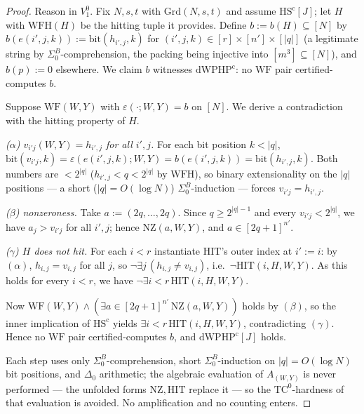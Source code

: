 \documentclass[10pt,a4paper]{amsart}
\newcommand{\Grd}{\mathrm{Grd}}
\newcommand{\HIT}{\mathrm{HIT}}
\newcommand{\HScert}{\mathrm{HS}^{\mathrm{c}}}
\newcommand{\NZ}{\mathrm{NZ}}
\newcommand{\SigmaB}{\Sigma^B_0}
\newcommand{\Vone}{V^0_1}
\newcommand{\WF}{\mathrm{WF}}
\newcommand{\WFH}{\mathrm{WFH}}
\newcommand{\dWPHPcert}{\mathrm{dWPHP}^{\mathrm{c}}}
\begin{document}
\begin{proof}
Reason in $\Vone$. Fix $N,s,t$ with $\Grd(N,s,t)$ and assume $\HScert[J]$;
let $H$ with $\WFH(H)$ be the hitting tuple it provides. Define
$b:=b(H)\subseteq[N]$ by $b(e(i',j,k)):=\mathrm{bit}(h_{i',j},k)$ for
$(i',j,k)\in[r]\times[n']\times[|q|]$ (a legitimate string by $\SigmaB$-comprehension,
the packing being injective into $[m^3]\subseteq[N]$), and $b(p):=0$ elsewhere.
We claim $b$ witnesses $\dWPHPcert$: no $\WF$ pair certified-computes $b$.

Suppose $\WF(W,Y)$ with $\varepsilon(\cdot;W,Y)=b$ on $[N]$. We derive a
contradiction with the hitting property of $H$.

\emph{(\(\alpha\)) $v_{i'j}(W,Y)=h_{i',j}$ for all $i',j$.} For each bit position
$k<|q|$, $\mathrm{bit}(v_{i'j},k)=\varepsilon(e(i',j,k);W,Y)=b(e(i',j,k))=
\mathrm{bit}(h_{i',j},k)$. Both numbers are $<2^{|q|}$ ($h_{i',j}<q<2^{|q|}$ by
$\WFH$), so binary extensionality on the $|q|$ positions --- a short
($|q|=O(\log N)$) $\SigmaB$-induction --- forces $v_{i'j}=h_{i',j}$.

\emph{(\(\beta\)) nonzeroness.} Take $a:=(2q,\dots,2q)$. Since $q\ge 2^{|q|-1}$
and every $v_{i'j}<2^{|q|}$, we have $a_j>v_{i'j}$ for all $i',j$; hence
$\NZ(a,W,Y)$, and $a\in[2q+1]^{n'}$.

\emph{(\(\gamma\)) $H$ does not hit.} For each $i<r$ instantiate $\HIT$'s outer
index at $i':=i$: by $(\alpha)$, $h_{i,j}=v_{i,j}$ for all $j$, so
$\neg\exists j\,(h_{i,j}\neq v_{i,j})$, i.e.\ $\neg\HIT(i,H,W,Y)$. As this holds
for every $i<r$, we have $\neg\exists i<r\,\HIT(i,H,W,Y)$.

Now $\WF(W,Y)\wedge(\exists a\in[2q+1]^{n'}\,\NZ(a,W,Y))$ holds by $(\beta)$,
so the inner implication of $\HScert$ yields $\exists i<r\,\HIT(i,H,W,Y)$,
contradicting $(\gamma)$. Hence no $\WF$ pair certified-computes $b$, and
$\dWPHPcert[J]$ holds.

Each step uses only $\SigmaB$-comprehension, short $\SigmaB$-induction on
$|q|=O(\log N)$ bit positions, and $\Delta_0$ arithmetic; the algebraic
evaluation of $A_{(W,Y)}$ is never performed --- the unfolded forms $\NZ,\HIT$
replace it --- so the $\mathrm{TC}^0$-hardness of that evaluation is avoided.
No amplification and no counting enters.
\end{proof}
\end{document}
